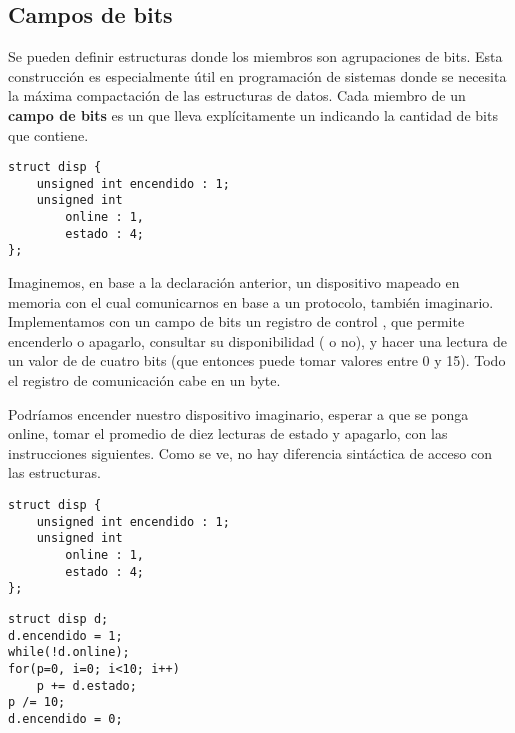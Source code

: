 \subsection{Campos de bits}
Se pueden definir estructuras donde los miembros son agrupaciones de bits. Esta
construcción es especialmente útil en programación de sistemas donde se
necesita la máxima compactación de las estructuras de datos. Cada miembro de un
\textbf{campo de bits} es un  que lleva explícitamente un  indicando
la cantidad de bits que contiene.
\begin{lstlisting}
struct disp {
    unsigned int encendido : 1;
    unsigned int
        online : 1,
        estado : 4;
};
\end{lstlisting}
\begin{ejemplo}
Imaginemos, en base a la declaración anterior, un dispositivo mapeado en memoria con el cual
comunicarnos en base a un protocolo, también imaginario. Implementamos con un
campo de bits un registro de control , que permite encenderlo o apagarlo,
consultar su disponibilidad ( o no), y hacer una lectura de un valor
de  de cuatro bits (que entonces puede tomar valores entre 0 y 15). Todo
el registro de comunicación cabe en un byte.

Podríamos encender nuestro dispositivo imaginario, esperar a que se ponga
online, tomar el promedio de diez lecturas de estado y apagarlo, con las
instrucciones siguientes. Como se ve, no hay diferencia sintáctica de acceso con las
estructuras.
\begin{lstlisting}
struct disp {
    unsigned int encendido : 1;
    unsigned int
        online : 1,
        estado : 4;
};
\end{lstlisting}

\begin{lstlisting}
struct disp d;
d.encendido = 1;
while(!d.online);
for(p=0, i=0; i<10; i++)
    p += d.estado;
p /= 10;
d.encendido = 0;
\end{lstlisting}
\end{ejemplo}




